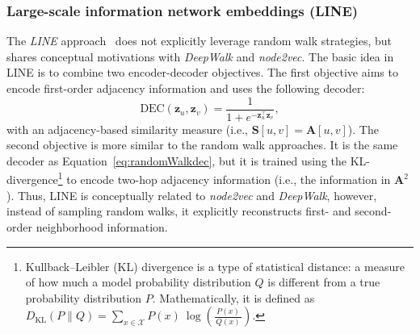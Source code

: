 \subsubsection{Large-scale information network embeddings (LINE)}
The \textit{LINE} approach~\cite{Tang2015line} does not explicitly leverage random walk strategies, but shares conceptual motivations with \textit{DeepWalk} and \textit{node2vec}. The basic idea in LINE is to combine two encoder-decoder objectives. The first objective aims to encode first-order adjacency information and uses the following decoder:
\begin{equation*}
    \text{DEC}(\mathbf{z}_u, \mathbf{z}_v) = \frac{1}{1 + e^{-\mathbf{z}_u^\top\mathbf{z}_v}},
\end{equation*}
with an adjacency-based similarity measure (i.e., $\textbf{S}[u,v] = \mathbf{A}[u,v]$). The second objective is more similar to the random walk approaches. It is the same decoder as Equation~\eqref{eq:randomWalkdec}, but it is trained using the KL-divergence\footnote{Kullback–Leibler (KL) divergence is a type of statistical distance: a measure of how much a model probability distribution $Q$ is different from a true probability distribution $P$. Mathematically, it is defined as $D_{\text{KL}}(P\parallel Q)=\sum_{x\in {\mathcal{X}}}P(x)\ \log \left({\frac{\ P(x)\ }{Q(x)}}\right)$.} to encode two-hop adjacency information (i.e., the information in $\mathbf{A}^2$). Thus, LINE is conceptually related to \textit{node2vec} and \textit{DeepWalk}, however, instead of sampling random walks, it explicitly reconstructs first- and second-order neighborhood information.


